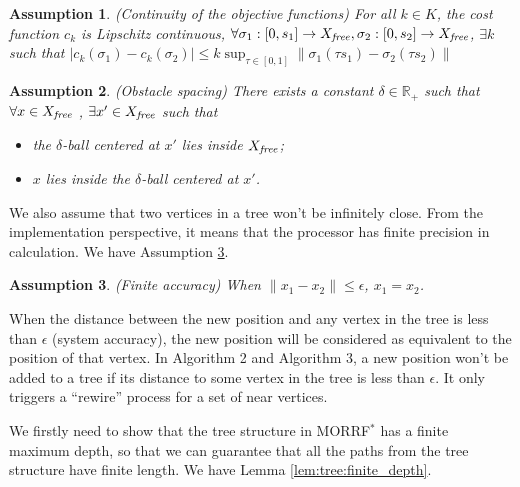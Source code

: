 \documentclass[conference]{IEEEtran}
\newtheorem{asmp}{Assumption}
\begin{document}
\begin{asmp}{(Continuity of the objective functions)}
\label{asmp:continuity}
For all $ k \in K $, the cost function $ c_{k} $ is Lipschitz continuous,
$ \forall \sigma_{1} : [ 0, s_{1} ] \rightarrow X_{\it free}, \sigma_{2} : [0, s_{2} ] \rightarrow X_{\it free} $,
$ \exists k $ such that 
$ | c_{k} ( \sigma_{1} ) - c_{k} ( \sigma_{2} ) | \leq k \sup_{\tau \in [0,1]} \lVert \sigma_{1} (\tau s_{1}) - \sigma_{2} (\tau s_{2}) \rVert $
\end{asmp}

\begin{asmp}{(Obstacle spacing)}
\label{asmp:spacing}
There exists a constant $ \delta \in \mathbb{R}_{+} $ such that $ \forall x \in X_{\it free} $ , $ \exists x' \in X_{\it free} $ such that
\begin{itemize}
\item the $ \delta $-ball centered at $ x' $ lies inside $ X_{\it free} $;
\item $ x $ lies inside the $ \delta $-ball centered at $ x' $.
\end{itemize}
\end{asmp}

We also assume that two vertices in a tree won't be infinitely close.
From the implementation perspective, it means that the processor has finite precision in calculation.
We have Assumption \ref{asmp:finite_accuracy}.
\begin{asmp}{(Finite accuracy)}
\label{asmp:finite_accuracy}
When $ \lVert x_{1} - x_{2} \rVert \leq \epsilon $, $ x_{1} = x_{2} $.
\end{asmp}
When the distance between the new position and any vertex in the tree is less than $ \epsilon $ (system accuracy), the new position will be considered as equivalent to the position of that vertex.
In Algorithm 2 and Algorithm 3, a new position won't be added to a tree if its distance to some vertex in the tree is less than $ \epsilon $.
It only triggers a ``rewire'' process for a set of near vertices.

We firstly need to show that the tree structure in MORRF$^{*}$ has a finite maximum depth,
so that we can guarantee that all the paths from the tree structure have finite length.
We have Lemma \ref{lem:tree:finite_depth}.
\end{document}
